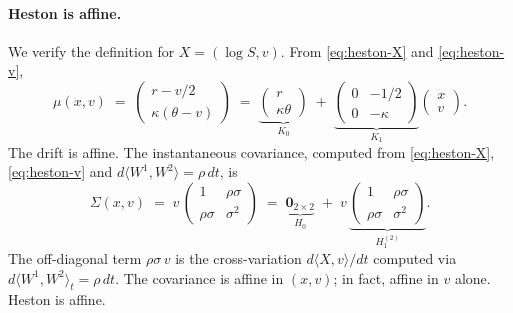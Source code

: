\documentclass[11pt]{article}
\theoremstyle{plain}
\theoremstyle{definition}
\theoremstyle{remark}
\begin{document}
\paragraph{Heston is affine.}
We verify the definition for \(X = (\log S, v)\). From \eqref{eq:heston-X} and \eqref{eq:heston-v},
\[
    \mu(x, v) \;=\; \begin{pmatrix} r - v/2 \\ \kappa(\theta - v) \end{pmatrix}
            \;=\; \underbrace{\begin{pmatrix} r \\ \kappa\theta \end{pmatrix}}_{K_0}
                \;+\; \underbrace{\begin{pmatrix} 0 & -1/2 \\ 0 & -\kappa \end{pmatrix}}_{K_1}\!\begin{pmatrix} x \\ v \end{pmatrix}.
\]
The drift is affine. The instantaneous covariance, computed from \eqref{eq:heston-X}, \eqref{eq:heston-v} and \(d\langle W^1, W^2\rangle = \rho\,dt\), is
\[
    \Sigma(x, v) \;=\; v\,\begin{pmatrix} 1 & \rho\sigma \\ \rho\sigma & \sigma^2 \end{pmatrix}
                \;=\; \underbrace{\mathbf{0}_{2\times 2}}_{H_0} \;+\; v\,\underbrace{\begin{pmatrix} 1 & \rho\sigma \\ \rho\sigma & \sigma^2 \end{pmatrix}}_{H_1^{(2)}}.
\]
The off-diagonal term \(\rho\sigma\,v\) is the cross-variation \(d\langle X, v\rangle/dt\) computed via \(d\langle W^1, W^2\rangle_t = \rho\,dt\). The covariance is affine in \((x, v)\); in fact, affine in \(v\) alone. Heston is affine.
\end{document}
